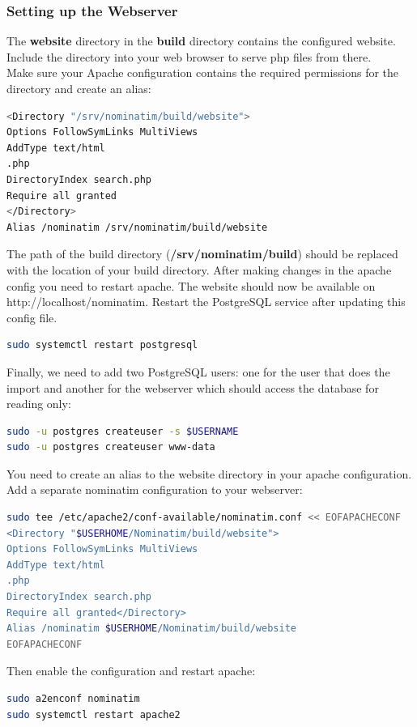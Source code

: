 \documentclass[12pt]{article}
\begin{document}
\subsubsection{Setting up the Webserver}
The \textbf{website} directory in the \textbf{build} directory contains the configured website. Include the directory into your web browser to serve php files from there.\\
Make sure your Apache configuration contains the required permissions for the directory and
create an alias:
\begin{lstlisting}[language=bash,breaklines=true]
<Directory "/srv/nominatim/build/website">
Options FollowSymLinks MultiViews
AddType text/html
.php
DirectoryIndex search.php
Require all granted
</Directory>
Alias /nominatim /srv/nominatim/build/website
\end{lstlisting}
The path of the build directory (\textbf{/srv/nominatim/build}) should be replaced with the location of your build directory. After making changes in the apache config you need to restart apache. The website should now be available on http://localhost/nominatim.
Restart the PostgreSQL service after updating this config file.
\begin{lstlisting}[language=bash,breaklines=true]
sudo systemctl restart postgresql
\end{lstlisting}
Finally, we need to add two PostgreSQL users: one for the user that does the import and another
for the webserver which should access the database for reading only:
\begin{lstlisting}[language=bash,breaklines=true]
sudo -u postgres createuser -s $USERNAME
sudo -u postgres createuser www-data
\end{lstlisting}
You need to create an alias to the website directory in your apache configuration. Add a
separate nominatim configuration to your webserver:
\begin{lstlisting}[language=bash,breaklines=true]
sudo tee /etc/apache2/conf-available/nominatim.conf << EOFAPACHECONF
<Directory "$USERHOME/Nominatim/build/website">
Options FollowSymLinks MultiViews
AddType text/html
.php
DirectoryIndex search.php
Require all granted</Directory>
Alias /nominatim $USERHOME/Nominatim/build/website
EOFAPACHECONF
\end{lstlisting}
Then enable the configuration and restart apache:
\begin{lstlisting}[language=bash,breaklines=true]
sudo a2enconf nominatim
sudo systemctl restart apache2
\end{lstlisting}
\end{document}
